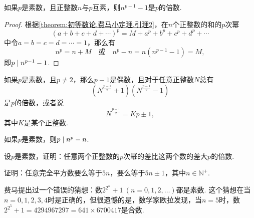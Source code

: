 \begin{theorem}[费马小定理]\label{theorem:初等数论.费马小定理}
如果\(p\)是素数，且正整数\(n\)与\(p\)互素，则\(n^{p-1}-1\)是\(p\)的倍数.
\begin{proof}
根据\cref{theorem:初等数论.费马小定理.引理2}，在\(n\)个正整数的和的\(p\)次幂\begin{equation*}
(a+b+c+d+\dotsb)^p = M + a^p + b^p + c^p + d^p + \dotsb
\end{equation*}中令\(a=b=c=d=\dotsb=1\)，那么有\begin{equation*}
n^p = n + M
\quad\text{或}\quad
n^p - n = n(n^{p-1}-1) = M,
\end{equation*}即\(\ExactlyDividedBy{n^{p-1}-1}{p}\).
\end{proof}
\end{theorem}

\begin{corollary}
如果\(p\)是素数，且\(p\neq2\)，那么\(p-1\)是偶数，且对于任意正整数\(N\)总有\begin{equation*}
\left(N^{\frac{p-1}{2}}+1\right)
\left(N^{\frac{p-1}{2}}-1\right)
\end{equation*}是\(p\)的倍数，或者说\begin{equation*}
N^{\frac{p-1}{2}} = Kp\pm1,
\end{equation*}其中\(K\)是某个正整数.
\end{corollary}

\begin{corollary}[费马小定理']
如果\(p\)是素数，则\(\ExactlyDividedBy{n^p-n}{p}\).
\end{corollary}

\begin{example}
设\(p\)是素数，证明：任意两个正整数的\(p\)次幂的差比这两个数的差大\(p\)的倍数.
\end{example}

\begin{example}
证明：任意完全平方数要么等于\(5n\)，要么等于\(5n\pm1\)，其中\(n\in\mathbb{N}^+\).
\end{example}

\begin{example}[费马猜想]
费马提出过一个错误的猜想：数\(2^{2^n}+1\ (n=0,1,2,\dotsc)\)都是素数.
这个猜想在当\(n=0,1,2,3,4\)时是正确的，但很遗憾的是，数学家欧拉发现，当\(n=5\)时，数\(2^{2^5}+1 = 4294967297 = 641 \times 6700417\)是合数.
\end{example}

